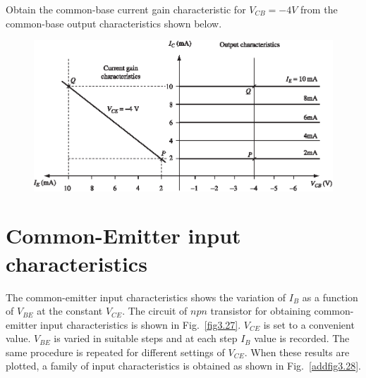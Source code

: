 \begin{example}\label{exam3.14}
Obtain the common-base current gain characteristic for $V_{CB}=-4V$ from the common-base output characteristics shown below.
\begin{figure}[H]
\centering
\includegraphics[scale=1.1]{chap2/S3-EE-03-025.eps}
\end{figure}
\end{example}


\section{Common-Emitter input characteristics}\label{sec3.20}

The common-emitter input characteristics shows the variation of $I_{B}$ as a function of $V_{BE}$ at the constant $V_{CE}$. The circuit of $npn$ transistor for obtaining common-emitter input characteristics is shown in Fig.~\ref{fig3.27}. $V_{CE}$ is set to a convenient value. $V_{BE}$ is varied in suitable steps and at each step $I_{B}$ value is recorded. The same procedure is repeated for different settings of $V_{CE}$. When these results are plotted, a family of input characteristics is obtained as shown in Fig.~\ref{addfig3.28}.

